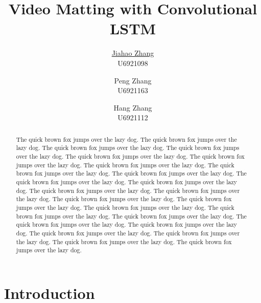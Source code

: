 \documentclass[final]{cvpr}
\begin{document}
\title{Video Matting with Convolutional LSTM}
\author{\underline{Jiahao Zhang} \\ U6921098 \and Peng Zhang \\ U6921163 \and Hang Zhang \\ U6921112}

\maketitle
\begin{abstract}
    The quick brown fox jumps over the lazy dog.
    The quick brown fox jumps over the lazy dog.
    The quick brown fox jumps over the lazy dog.
    The quick brown fox jumps over the lazy dog.
    The quick brown fox jumps over the lazy dog.
    The quick brown fox jumps over the lazy dog.
    The quick brown fox jumps over the lazy dog.
    The quick brown fox jumps over the lazy dog.
    The quick brown fox jumps over the lazy dog.
    The quick brown fox jumps over the lazy dog.
    The quick brown fox jumps over the lazy dog.
    The quick brown fox jumps over the lazy dog.
    The quick brown fox jumps over the lazy dog.
    The quick brown fox jumps over the lazy dog.
    The quick brown fox jumps over the lazy dog.
    The quick brown fox jumps over the lazy dog.
    The quick brown fox jumps over the lazy dog.
    The quick brown fox jumps over the lazy dog.
    The quick brown fox jumps over the lazy dog.
    The quick brown fox jumps over the lazy dog.
    The quick brown fox jumps over the lazy dog.
    The quick brown fox jumps over the lazy dog.
    The quick brown fox jumps over the lazy dog.
    The quick brown fox jumps over the lazy dog.
\end{abstract}

\section{Introduction}
\end{document}
